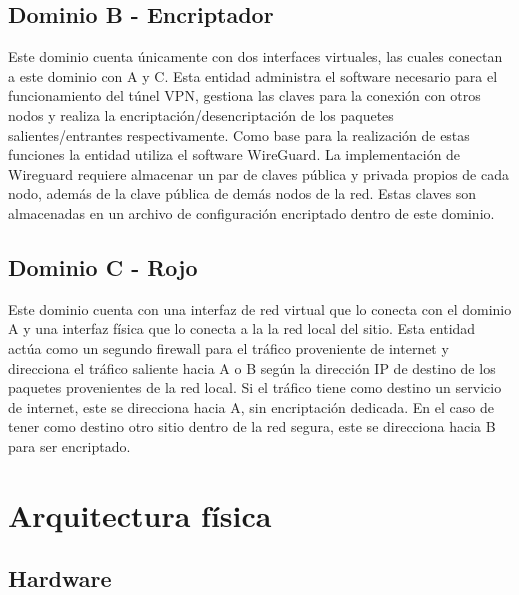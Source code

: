 \subsection{Dominio B - Encriptador}
Este dominio cuenta únicamente con dos interfaces virtuales, las cuales conectan a este dominio con A y C. Esta entidad administra el software necesario para el funcionamiento del túnel VPN, gestiona las claves para la conexión con otros nodos y realiza la encriptación/desencriptación de los paquetes salientes/entrantes respectivamente. Como base para la realización de estas funciones la entidad utiliza el software WireGuard.
La implementación de Wireguard requiere almacenar un par de claves pública y privada propios de cada nodo, además de la clave pública de demás nodos de la red. Estas claves son almacenadas en un archivo de configuración encriptado dentro de este dominio.

\subsection{Dominio C - Rojo}
Este dominio cuenta con una interfaz de red virtual que lo conecta con el dominio A y una interfaz física que lo conecta a la la red local del sitio. Esta entidad actúa como un segundo firewall para el tráfico proveniente de internet y direcciona el tráfico saliente hacia A o B según la dirección IP de destino de los paquetes provenientes de la red local. Si el tráfico tiene como destino un servicio de internet, este se direcciona hacia A, sin encriptación dedicada. En el caso de tener como destino otro sitio dentro de la red segura, este se direcciona hacia B para ser encriptado.




\section{Arquitectura física}


\subsection{Hardware}

\clearpage